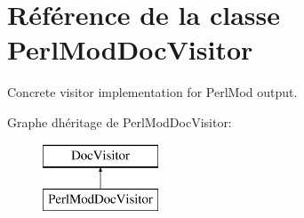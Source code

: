 \hypertarget{class_perl_mod_doc_visitor}{}\section{Référence de la classe Perl\+Mod\+Doc\+Visitor}
\label{class_perl_mod_doc_visitor}


Concrete visitor implementation for Perl\+Mod output.  


Graphe d\textquotesingle{}héritage de Perl\+Mod\+Doc\+Visitor\+:\begin{figure}[H]
\begin{center}
\leavevmode
\includegraphics[height=2.000000cm]{class_perl_mod_doc_visitor}
\end{center}
\end{figure}

